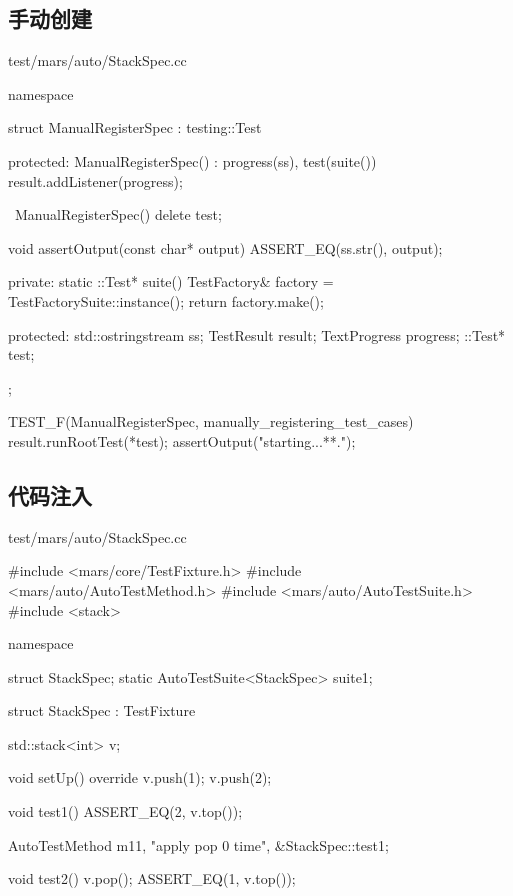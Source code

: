 \begin{content}

\subsection{手动创建}

\begin{nodiff}{test/mars/auto/StackSpec.cc}
 \begin{c++}
namespace {
  struct ManualRegisterSpec : testing::Test {
  protected:
    ManualRegisterSpec() : progress(ss), test(suite()) {
      result.addListener(progress);
    }

    ~ManualRegisterSpec() {
      delete test;
    }

    void assertOutput(const char* output) {
      ASSERT_EQ(ss.str(), output);
    }

  private:
    static ::Test* suite() {
      TestFactory& factory = TestFactorySuite::instance();
      return factory.make();
    }

  protected:
    std::ostringstream ss;
    TestResult result;
    TextProgress progress;
    ::Test* test;
  };
}

TEST_F(ManualRegisterSpec, manually_registering_test_cases) {
  result.runRootTest(*test);
  assertOutput("starting...\n***\nend.\n");
}
 \end{c++}
\end{nodiff}

\subsection{代码注入}

\begin{nodiff}{test/mars/auto/StackSpec.cc}
 \begin{c++}
#include <mars/core/TestFixture.h>
#include <mars/auto/AutoTestMethod.h>
#include <mars/auto/AutoTestSuite.h>
#include <stack>

namespace {
  struct StackSpec;
  static AutoTestSuite<StackSpec> suite1;

  struct StackSpec : TestFixture {
    std::stack<int> v;

    void setUp() override {
      v.push(1);
      v.push(2);
    }

    void test1() {
      ASSERT_EQ(2, v.top());
    }

    AutoTestMethod m1{1, "apply pop 0 time", &StackSpec::test1};

    void test2() {
      v.pop();
      ASSERT_EQ(1, v.top());
    }

}}
\end{c++}
\end{nodiff}
\end{content}

